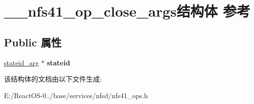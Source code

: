 \hypertarget{struct____nfs41__op__close__args}{}\section{\+\_\+\+\_\+nfs41\+\_\+op\+\_\+close\+\_\+args结构体 参考}
\label{struct____nfs41__op__close__args}
\subsection*{Public 属性}
\begin{DoxyCompactItemize}
\item 
\mbox{\label{struct____nfs41__op__close__args_a1eaa9c2f42dc86fa0820a28a1df59649}} 
\hyperlink{struct____stateid__arg}{stateid\+\_\+arg} $\ast$ {\bfseries stateid}
\end{DoxyCompactItemize}


该结构体的文档由以下文件生成\+:\begin{DoxyCompactItemize}
\item 
E\+:/\+React\+O\+S-\/0../base/services/nfsd/nfs41\+\_\+ops.\+h\end{DoxyCompactItemize}
